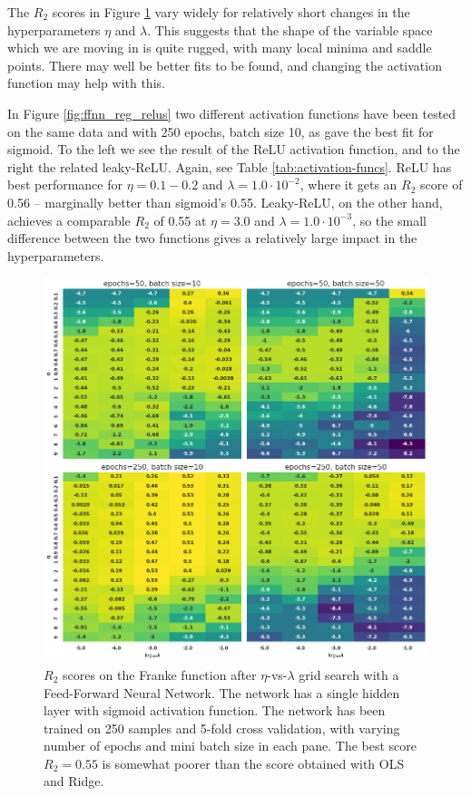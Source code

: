 \documentclass[]{article}
\begin{document}
The $R_2$ scores in Figure \ref{fig:ffnn_reg_sigmoid} vary widely for relatively short changes in the hyperparameters $\eta$ and $\lambda$. This suggests that the shape of the variable space which we are moving in is quite rugged, with many local minima and saddle points. There may well be better fits to be found, and changing the activation function may help with this. 

In Figure \ref*{fig:ffnn_reg_relus} two different activation functions have been tested on the same data and with 250 epochs, batch size 10, as gave the best fit for sigmoid. To the left we see the result of the ReLU activation function, and to the right the related leaky-ReLU. Again, see Table \ref{tab:activation-funcs}. ReLU has best performance for $\eta = 0.1-0.2$ and $\lambda=1.0 \cdot 10^{-2}$, where it gets an $R_2$ score of 0.56 -- marginally better than sigmoid's 0.55. Leaky-ReLU, on the other hand, achieves a comparable $R_2$ of 0.55 at $\eta = 3.0$ and $\lambda=1.0 \cdot 10^{-3}$, so the small difference between the two functions gives a relatively large impact in the hyperparameters.

\begin{figure}[!htb]
	\centering
	\includegraphics[width=1\linewidth]{ffnn_reg_sigmoid.png}
	\caption{$R_2$ scores on the Franke function after $\eta$-vs-$\lambda$ grid search with a Feed-Forward Neural Network. The network has a single hidden layer with sigmoid activation function. The network has been trained on 250 samples and 5-fold cross validation, with varying number of epochs and mini batch size in each pane. The best score $R_2=0.55$ is somewhat poorer than the score obtained with OLS and Ridge.}
	\label{fig:ffnn_reg_sigmoid}
\end{figure}
\end{document}
